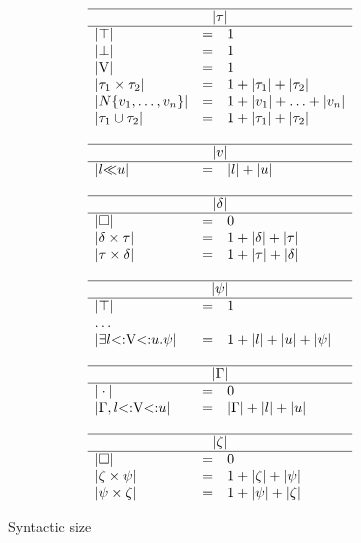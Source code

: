 \begin{figure}
\footnotesize
\[
\begin{array}{lcl}
    \hline
    \multicolumn{3}{c}{\size{\ty}} \\ 
    \hline 
    \size{\tyany} &=& 1\\
    \size{\tybot} &=& 1\\
    \size{\vany}  &=& 1\\
    \size{\typair{\ty_1}{\ty_2}}  &=& 1 + \size{\ty_1} + \size{\ty_2}\\
    \size{\tyinv\iname{\rexvar_1,\ldots,\rexvar_n}} &=&
        1 + \size{\rexvar_1} + \ldots + \size{\rexvar_n}\\
    \size{\tyunion{\ty_1}{\ty_2}} &=& 1 + \size{\ty_1} + \size{\ty_2}\\
    \\
    \hline
    \multicolumn{3}{c}{\size{\rexvar}} \\ 
    \hline 
    \size{\rexvarbound{\tylb}{\tyub}} &=& \size{\tylb} + \size{\tyub}\\
    \\
    \hline
    \multicolumn{3}{c}{\size{\dctx}} \\ 
    \hline 
    \size{\square} &=& 0\\
    \size{\typair{\dctx}{\ty}} &=& 
        1 + \size{\dctx} + \size{\ty}\\
    \size{\typair{\ty}{\dctx}} &=& 
        1 + \size{\ty} + \size{\dctx}\\
    \\
    \hline
    \multicolumn{3}{c}{\size{\tysig}} \\ 
    \hline 
    \size{\tyany} &=& 1\\
    \multicolumn{3}{l}{\ldots} \\
    \size{\tyexist{\vany}{\tylb}{\tyub}{\tysig}} &=& 
        1 + \size{\tylb} + \size{\tyub} + \size{\tysig}\\
    \\
    \hline
    \multicolumn{3}{c}{\size{\AEnv}} \\ 
    \hline 
    \size{\EmptyEnv} &=& 0 \\
    \size{\AEnv, \varbound{\vany}{\tylb}{\tyub}} &=& 
        \size{\AEnv} + \size{\tylb} + \size{\tyub}\\
    \\
    \hline
    \multicolumn{3}{c}{\size{\dctxsig}} \\ 
    \hline 
    \size{\square} &=& 0\\
    \size{\typair{\dctxsig}{\tysig}} &=& 
        1 + \size{\dctxsig} + \size{\tysig}\\
    \size{\typair{\tysig}{\dctxsig}} &=& 
        1 + \size{\tysig} + \size{\dctxsig}\\
\end{array}
\]
\caption{Syntactic size}\label{fig:ty-size}
\end{figure}

